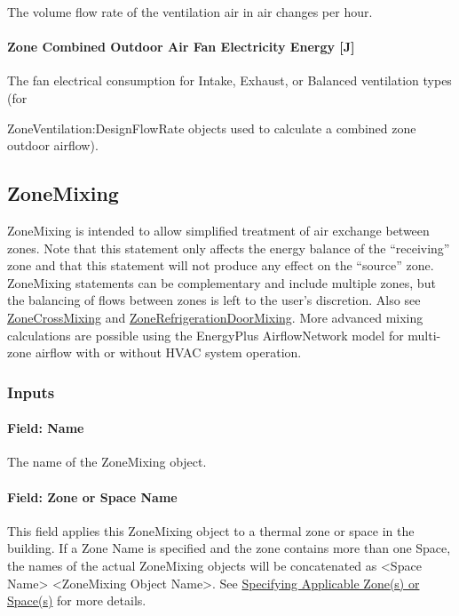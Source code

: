 The volume flow rate of the ventilation air in air changes per hour.

\paragraph{Zone Combined Outdoor Air Fan Electricity Energy {[}J{]}}\label{zone-combined-outdoor-air-fan-electric-energy-j}

The fan electrical consumption for Intake, Exhaust, or Balanced ventilation types (for

ZoneVentilation:DesignFlowRate objects used to calculate a combined zone outdoor airflow).

\subsection{ZoneMixing}\label{zonemixing}

ZoneMixing is intended to allow simplified treatment of air exchange between zones. Note that this statement only affects the energy balance of the ``receiving'' zone and that this statement will not produce any effect on the ``source'' zone. ZoneMixing statements can be complementary and include multiple zones, but the balancing of flows between zones is left to the user's discretion. Also see \hyperref[zonecrossmixing]{ZoneCrossMixing} and \hyperref[zonerefrigerationdoormixing]{ZoneRefrigerationDoorMixing}. More advanced mixing calculations are possible using the EnergyPlus AirflowNetwork model for multi-zone airflow with or without HVAC system operation.

\subsubsection{Inputs}\label{inputs-5-004}

\paragraph{Field: Name}\label{field-name-5-004}

The name of the ZoneMixing object.

\paragraph{Field: Zone or Space Name}\label{field-zone-name-3}

This field applies this ZoneMixing object to a thermal zone or space in the building. If a Zone Name is specified and the zone contains more than one Space, the names of the actual ZoneMixing objects will be concatenated as \textless{}Space Name\textgreater{} \textless{}ZoneMixing Object Name\textgreater{}. See \hyperref[specifying-applicable-zones-or-spaces]{Specifying Applicable Zone(s) or Space(s)} for more details.

